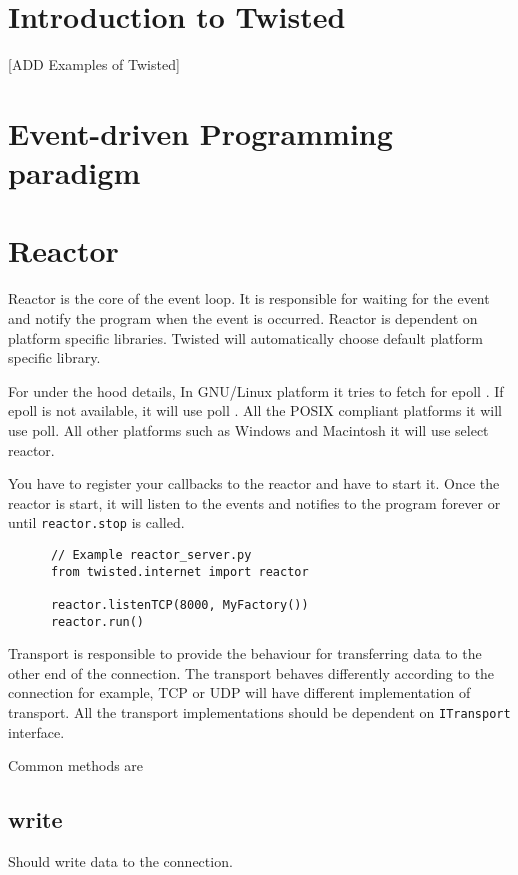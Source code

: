 \documentclass{article}
\begin{document}
  \section{Introduction to Twisted}
    [ADD Examples of Twisted]
  \section{Event-driven Programming paradigm}

  \section{Reactor}
    Reactor is the core of the event loop. It is responsible for waiting for
    the event and notify the program when the event is occurred. Reactor is
    dependent on platform specific libraries. Twisted will automatically choose
    default platform specific library.

    For under the hood details, In GNU/Linux platform it tries to fetch for
    epoll \cite{epoll}.  If epoll \cite{epoll} is not available, it will use
    poll \cite{poll}. All the POSIX compliant platforms it will use poll. All
    other platforms such as Windows and Macintosh it will use select reactor.

    You have to register your callbacks to the reactor and have to start it.
    Once the reactor is start, it will listen to the events and notifies to the
    program forever or until \texttt{reactor.stop} is called.

    \begin{verbatim}
      // Example reactor_server.py
      from twisted.internet import reactor

      reactor.listenTCP(8000, MyFactory())
      reactor.run()
    \end{verbatim}


    Transport is responsible to provide the behaviour for transferring data to
    the other end of the connection. The transport behaves differently
    according to the connection for example, TCP or UDP will have different
    implementation of transport. All the transport implementations should be
    dependent on \texttt{ITransport} interface.

    Common methods are

    \subsection{write} Should write data to the connection.
\end{document}
